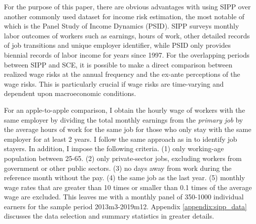 For the purpose of this paper, there are obvious advantages with using SIPP over another commonly used dataset for income risk estimation, the most notable of which is the Panel Study of Income Dynamics (PSID). SIPP surveys monthly labor outcomes of workers such as earnings, hours of work, other detailed records of job transitions and unique employer identifier, while PSID only provides biennial records of labor income for years since 1997. For the  overlapping periods between SIPP and SCE, it is possible to make a direct comparison between realized wage risks at the annual frequency and the ex-ante perceptions of the wage risks. This is particularly crucial if wage risks are time-varying and dependent upon macroeconomic conditions. 

For an apple-to-apple comparison, I obtain the hourly wage of workers with the same employer by dividing the total monthly earnings from the \emph{primary job} by the average hours of work for the same job for those who only stay with the same employer for at least 2 years. I follow the same approach as in \cite{low2010wage} to identify job stayers. In addition, I impose the following criteria. (1) only working-age population between 25-65. (2) only private-sector jobs, excluding workers from government or other public sectors. (3) no days away from work during the reference month without the pay. (4) the same job as the last year. (5) monthly wage rates that are greater than 10 times or smaller than 0.1 times of the average wage are excluded. This leaves me with a monthly panel of 350-1000 individual earners for the sample period 2013m3-2019m12. Appendix \ref{appendix:sipp_data} discusses the data selection and summary statistics in greater details. 